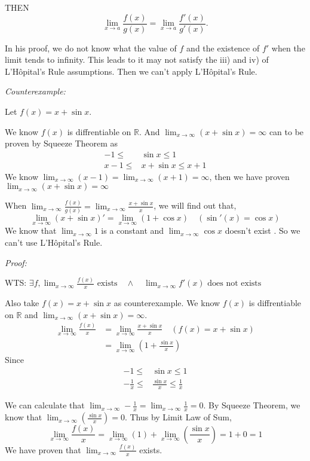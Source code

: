 \documentclass[12pt]{exam}
\newcommand*\circled[1]{\tikz[baseline=(char.base)]{
    \node[shape=circle, draw, inner sep=1pt, 
        minimum height=12pt] (char) {#1};}}
\newcommand{\R}{\mathbb{R}}
\begin{document}
\begin{enumerate}
\begin{enumerate}
\begin{itemize}
			\end{itemize}
			THEN
			$$
			    \lim_{x \to a}\frac{f(x)}{g(x)}=\lim_{x \to a}\frac{f'(x)}{g'(x)}.
			$$
			
			In his proof, we do not know what the value of $f$ and the existence of $f'$  when the limit tends to infinity. This leads to it may not satisfy the iii) and iv) of L'H\^{o}pital's Rule assumptions. Then we can't apply L'H\^{o}pital's Rule.
			
			\emph{Counterexample:}
			
			Let $f(x)=x+\sin{x}$.
			
			We know $f(x)$ is diffrentiable on $\R$.
			And $\lim_{x \to \infty}(x+\sin{x})=\infty$ can to be proven by Squeeze Theorem as
			\begin{align*}
			    -1\leq&\sin{x}\leq 1\\
			    x-1\leq&x+\sin{x}\leq x+1
			\end{align*}
			We know $\lim_{x \to \infty}(x-1)=\lim_{x \to \infty}(x+1)=\infty$, then we have proven $\lim_{x \to \infty}(x+\sin{x})=\infty$ \circled{6}
			
			When $\lim_{x \to \infty}\frac{f(x)}{g(x)}=\lim_{x \to \infty}\frac{x+\sin{x}}{x}$, we will find out that,
			$$
			    \lim_{x \to \infty}(x+\sin{x})'=\lim_{x \to \infty}(1+\cos{x})\quad(\sin'(x)=\cos{x})
			$$
			We know that $\lim_{x \to \infty}1$ is a constant and $\lim_{x \to \infty}\cos{x}$ doesn't exist \circled{7}. So we can't use L'H\^{o}pital's Rule.
			
			\emph{Proof:}

			WTS: $\exists f, \lim_{x \to \infty} \frac{f(x)}{x} \mbox{ exists} \quad \land \quad \lim_{x \to \infty} f'(x) \mbox{ does not exists }$
			
			Also take $f(x)=x+\sin{x}$ as counterexample.
			We know $f(x)$ is diffrentiable on $\R$ and $\lim_{x \to \infty}(x+\sin{x})=\infty$. \circled{6}
			\begin{align*}
			    \lim_{x \to \infty}\frac{f(x)}{x}&=\lim_{x \to \infty}\frac{x+\sin{x}}{x}\quad(f(x)=x+\sin{x})\\
			    &=\lim_{x \to \infty}(1+\frac{\sin{x}}{x})
			\end{align*}
			Since
		    \begin{align*}
		        -1\leq&\sin{x}\leq1\\
		        -\frac{1}{x}\leq&\frac{\sin{x}}{x}\leq\frac{1}{x}
		     \end{align*}
		
		    We can calculate that $\lim_{x \to \infty}-\frac{1}{x}=\lim_{x \to \infty}\frac{1}{x}=0$. By Squeeze Theorem, we know that $\lim_{x \to \infty}(\frac{\sin{x}}{x})=0$. Thus by     Limit Law of Sum,
		    $$
		        \lim_{x \to \infty} \frac{f(x)}{x}=\lim_{x \to \infty}(1)+\lim_{x \to \infty}(\frac{\sin{x}}{x})=1+0=1
		    $$
			We have proven that $\lim_{x \to \infty} \frac{f(x)}{x}$ exists.
			

\end{enumerate}
\end{enumerate}
\end{document}

